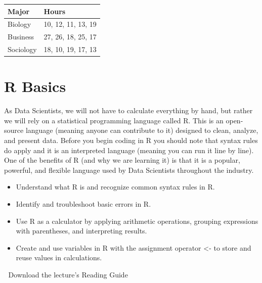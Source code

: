\documentclass[
  letterpaper,
  DIV=11,
  numbers=noendperiod]{scrreprt}
\providecommand{\tightlist}{%
  \setlength{\itemsep}{0pt}\setlength{\parskip}{0pt}}
\begin{document}
\begin{longtable}[]{@{}ll@{}}
\toprule\noalign{}
Major & Hours \\
\midrule\noalign{}
\endhead
\bottomrule\noalign{}
\endlastfoot
Biology & 10, 12, 11, 13, 19 \\
Business & 27, 26, 18, 25, 17 \\
Sociology & 18, 10, 19, 17, 13 \\
\end{longtable}


\chapter{R Basics}\label{r-basics}

As Data Scientists, we will not have to calculate everything by hand,
but rather we will rely on a statistical programming language called R.
This is an open-source language (meaning anyone can contribute to it)
designed to clean, analyze, and present data. Before you begin coding in
R you should note that syntax rules do apply and it is an interpreted
language (meaning you can run it line by line). One of the benefits of R
(and why we are learning it) is that it is a popular, powerful, and
flexible language used by Data Scientists throughout the industry.

\begin{itemize}
\tightlist
\item
  Understand what R is and recognize common syntax rules in R.
\item
  Identify and troubleshoot basic errors in R.
\item
  Use R as a calculator by applying arithmetic operations, grouping
  expressions with parentheses, and interpreting results.
\item
  Create and use variables in R with the assignment operator \textless-
  to store and reuse values in calculations.
\end{itemize}

\begin{tcolorbox}[enhanced jigsaw, leftrule=.75mm, arc=.35mm, coltitle=black, rightrule=.15mm, bottomrule=.15mm, toprule=.15mm, left=2mm, colbacktitle=quarto-callout-tip-color!10!white, title=\textcolor{quarto-callout-tip-color}{\faLightbulb}\hspace{0.5em}{Supplemental Material}, toptitle=1mm, breakable, colframe=quarto-callout-tip-color-frame, bottomtitle=1mm, titlerule=0mm, colback=white, opacityback=0, opacitybacktitle=0.6]

📄 Download the lecture's Reading Guide

\end{tcolorbox}
\end{document}
